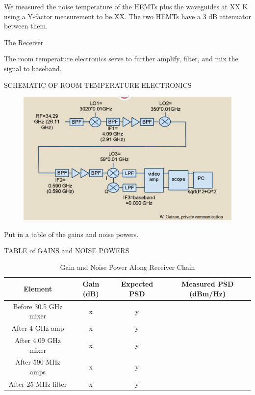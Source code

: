 \documentclass[11pt]{article}
\begin{document}
We measured the noise temperature of the HEMTs plus the waveguides at XX K using a Y-factor measurement to be XX. The two HEMTs have a 3 dB attenuator between them.

The Receiver

The room temperature electronics serve to further amplify, filter, and mix the signal to baseband. 

SCHEMATIC OF ROOM TEMPERATURE ELECTRONICS
\begin{figure}
\includegraphics[scale=0.3]{receiverdiagram}
\end{figure}

Put in a table of the gains and noise powers.

TABLE of GAINS and NOISE POWERS
\begin{table}[ht]
\caption{Gain and Noise Power Along Receiver Chain}
\begin{tabular}{c c c c}
\hline\hline
Element & Gain (dB) & Expected PSD & Measured PSD (dBm/Hz)\\ [0.5ex]
\hline
Before 30.5 GHz mixer & x & y \\
After 4 GHz amp & x & y \\
After 4.09 GHz mixer & x & y \\
After 590 MHz amps & x & y \\
After 25 MHz filter & x & y \\ [1ex]
\hline
\end{tabular}
\label{table:gainsofreceiverchain}
\end{table}
\end{document}
